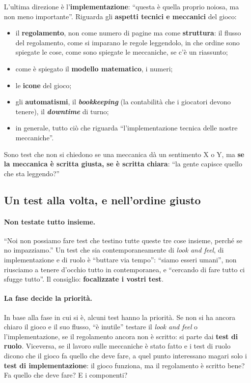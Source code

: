 L'ultima direzione è l'\textbf{implementazione}: ``questa è quella proprio noiosa, ma
non meno importante''. Riguarda gli \textbf{aspetti tecnici e meccanici} del gioco:
\begin{itemize}
  \item il \textbf{regolamento}, non come numero di pagine ma come \textbf{struttura}: il
        flusso del regolamento, come si imparano le regole leggendolo, in che ordine
        sono spiegate le cose, come sono spiegate le meccaniche, se c'è un riassunto;
  \item come è spiegato il \textbf{modello matematico}, i numeri;
  \item le \textbf{icone} del gioco;
  \item gli \textbf{automatismi}, il \textbf{\emph{bookkeeping}} (la contabilità che i
        giocatori devono tenere), il \textbf{\emph{downtime}} di turno;
  \item in generale, tutto ciò che riguarda ``l'implementazione tecnica delle nostre
        meccaniche''.
\end{itemize}
Sono test che non si chiedono se una meccanica dà un sentimento X o Y, ma \textbf{se la
meccanica è scritta giusta, se è scritta chiara}: ``la gente capisce quello che sta
leggendo?''

\subsection{Un test alla volta, e nell'ordine giusto}

\paragraph{Non testate tutto insieme.} ``Noi non possiamo fare test che testino tutte
queste tre cose insieme, perché se no impazziamo.'' Un test che sia contemporaneamente di
\emph{look and feel}, di implementazione e di ruolo è ``buttare via tempo'': ``siamo
esseri umani'', non riusciamo a tenere d'occhio tutto in contemporanea, e ``cercando di
fare tutto ci sfugge tutto''. Il consiglio: \textbf{focalizzate i vostri test}.

\paragraph{La fase decide la priorità.} In base alla fase in cui si è, alcuni test hanno
la priorità. Se non si ha ancora chiaro il gioco e il suo flusso, ``è inutile'' testare il
\emph{look and feel} o l'implementazione, se il regolamento ancora non è scritto: si
parte dai \textbf{test di ruolo}. Viceversa, se il lavoro sulle meccaniche è stato fatto
e i test di ruolo dicono che il gioco fa quello che deve fare, a quel punto interessano
magari solo i \textbf{test di implementazione}: il gioco funziona, ma il regolamento è
scritto bene? Fa quello che deve fare? E i componenti?

